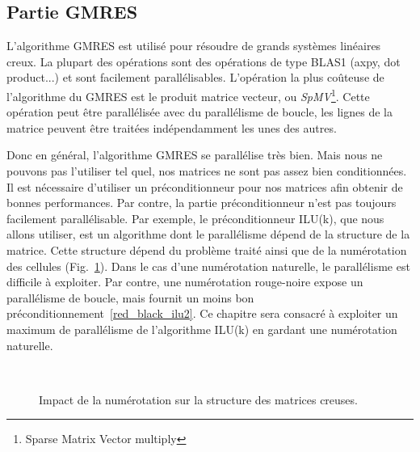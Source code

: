 \subsection{Partie GMRES}
L'algorithme GMRES est utilisé pour résoudre de grands systèmes linéaires creux.
%
La plupart des opérations sont des opérations de type BLAS1 (axpy, dot product...) et sont facilement parallélisables.
%
L'opération la plus coûteuse de l'algorithme du GMRES est le produit matrice vecteur, ou {\em SpMV}\footnote{Sparse Matrix Vector multiply}.
%
Cette opération peut être parallélisée avec du parallélisme de boucle, les lignes de la matrice peuvent être traitées indépendamment les unes des autres.


Donc en général, l'algorithme GMRES se parallélise très bien.
%
Mais nous ne pouvons pas l'utiliser tel quel, nos matrices ne sont pas assez bien conditionnées.
%
Il est nécessaire d'utiliser un préconditionneur pour nos matrices afin obtenir de bonnes performances.
%
Par contre, la partie préconditionneur n'est pas toujours facilement parallélisable.
%
Par exemple, le préconditionneur ILU(k), que nous allons utiliser, est un algorithme dont le parallélisme dépend de la structure de la matrice.
%
Cette structure dépend du problème traité ainsi que de la numérotation des cellules (Fig.~\ref{fig:matrix_ordering}).
%
Dans le cas d'une numérotation naturelle, le parallélisme est difficile à exploiter.
%
Par contre, une numérotation rouge-noire expose un parallélisme de boucle, mais fournit un moins bon préconditionnement~\ref{red_black_ilu2}.
%
Ce chapitre sera consacré à exploiter un maximum de parallélisme de l'algorithme ILU(k) en gardant une numérotation naturelle.

\begin{figure}[!ht]
     \begin{center}
        \\%
    \end{center}
    \caption{Impact de la numérotation sur la structure des matrices creuses.}
    \label{fig:matrix_ordering}
\end{figure}



